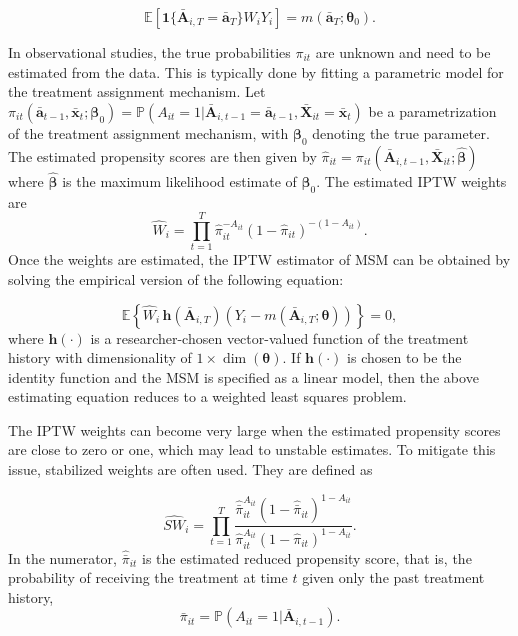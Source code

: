 \begin{equation}
    \label{eq:ipw-identification}
\mathbb{E}\!\left[\mathbf{1}\{\bar{\mathbf{A}}_{i,T}=\bar{\mathbf{a}}_T\}W_iY_i\right]=m(\bar{\mathbf{a}}_T;\boldsymbol{\theta}_0).
\end{equation}

In observational studies, the true probabilities $\pi_{it}$ are unknown and need to be 
estimated from the data. This is typically done by fitting a parametric model for the 
treatment assignment mechanism. Let $\pi_{it}(\bar{\mathbf{a}}_{t-1}, \bar{\mathbf{x}}_{t}; \boldsymbol{\beta}_0) = \mathbb{P}(A_{it} = 1 | \bar{\mathbf{A}}_{i,t-1} = \bar{\mathbf{a}}_{t-1}, \bar{\mathbf{X}}_{it} = \bar{\mathbf{x}}_{t})$ be a 
parametrization of the treatment assignment mechanism, with $\boldsymbol{\beta}_0$ denoting the true parameter. The 
estimated propensity scores are then given by $\hat{\pi}_{it} = \pi_{it}(\bar{\mathbf{A}}_{i,t-1}, \bar{\mathbf{X}}_{it}; \hat{\boldsymbol{\beta}})$ where $\hat{\boldsymbol{\beta}}$ is the maximum likelihood estimate of $\boldsymbol{\beta}_0$.
The estimated IPTW weights are
\begin{equation}
    \label{eq:ipw-weights}
\widehat{W}_{i} = \prod_{t=1}^{T} \hat{\pi}_{it}^{-A_{it}} (1-\hat{\pi}_{it})^{-(1-A_{it})}.
\end{equation}
Once the weights are estimated, the IPTW estimator of MSM can be obtained by solving the empirical version of the following equation:

\begin{equation}
    \label{eq:ipw-estimation}
\mathbb{E}\left\{\widehat{W}_i\, \mathbf{h}\!\left(\bar{\mathbf{A}}_{i,T}\right)\left(Y_i - m\!\left(\bar{\mathbf{A}}_{i,T};\boldsymbol{\theta}\right)\right)\right\}=0,
\end{equation}
where $\mathbf{h}(\cdot)$ is a researcher-chosen vector-valued function of the treatment history with dimensionality of  
$1 \times \dim(\boldsymbol{\theta})$. If $\mathbf{h}(\cdot)$ 
is chosen to be the identity function and the MSM is specified as a linear model, 
then the above estimating equation reduces to a weighted least squares problem.

The IPTW weights can become 
very large when the estimated propensity scores are close to zero or one,
which may lead to unstable estimates. To mitigate this issue, stabilized weights 
are often used.  They are defined as 

\begin{equation}
    \label{eq:stabilized-weights}
\widehat{SW}_i
=
\prod_{t=1}^{T}
\frac{
\hat{\bar{\pi}}_{it}^{A_{it}}\left(1-\hat{\bar{\pi}}_{it}\right)^{1-A_{it}}
}{
\hat{\pi}_{it}^{A_{it}}\left(1-\hat{\pi}_{it}\right)^{1-A_{it}}
}.
\end{equation}
In the numerator, ${\hat{\bar{\pi}}}_{it}$ is the estimated 
reduced propensity score, that is, the probability of 
receiving the treatment at time $t$ given only the past treatment history, 
\[
\bar{\pi}_{it} = \mathbb{P}(A_{it} = 1 | \bar{\mathbf{A}}_{i,t-1}).
\]

